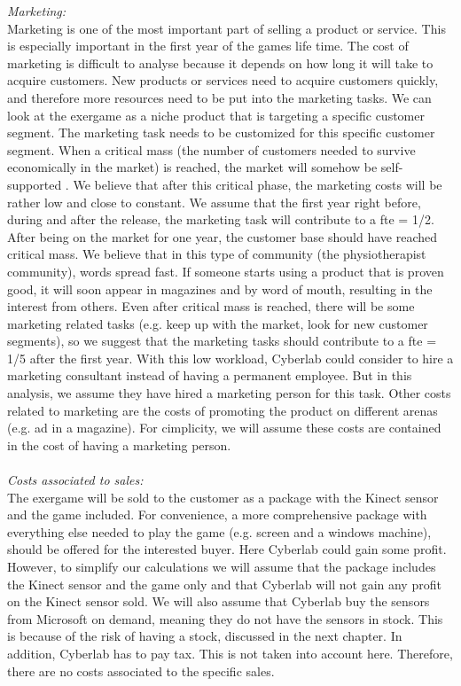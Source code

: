 \emph{Marketing:}\\
Marketing is one of the most important part of selling a product or service. This is especially important in the first year of the games life time. The cost of marketing is difficult to analyse because it depends on how long it will take to acquire customers. New products or services need to acquire customers quickly, and therefore more resources need to be put into the marketing tasks. We can look at the exergame as a niche product that is targeting a specific customer segment. The marketing task needs to be customized for this specific customer segment. When a critical mass (the number of customers needed to survive economically in the market) is reached, the market will somehow be self-supported \cite{informationrules}. We believe that after this critical phase, the marketing costs will be rather low and close to constant. We assume that the first year right before, during and after the release, the marketing task will contribute to a \ac{fte} = 1/2. After being on the market for one year, the customer base should have reached critical mass.  We believe that in this type of community (the physiotherapist community), words spread fast. If someone starts using a product that is proven good, it will soon appear in magazines and by word of mouth, resulting in the interest from others. Even after critical mass is reached, there will be some marketing related tasks (e.g. keep up with the market, look for new customer segments), so we suggest that the marketing tasks should contribute to a \ac{fte} = 1/5 after the first year. With this low workload, Cyberlab could consider to hire a marketing consultant instead of having a permanent employee. But in this analysis, we assume they have hired a marketing person for this task. Other costs related to marketing are the costs of promoting the product on different arenas (e.g. ad in a magazine). For cimplicity, we will assume these costs are contained in the cost of having a marketing person. \\ \\
\emph{Costs associated to sales:}\\
The exergame will be sold to the customer as a package with the Kinect sensor and the game included. For convenience, a more comprehensive package with everything else needed to play the game (e.g. screen and a windows machine), should be offered for the interested buyer. Here Cyberlab could gain some profit. However, to simplify our calculations we will assume that the package includes the Kinect sensor and the game only and that Cyberlab will not gain any profit on the Kinect sensor sold. We will also assume that Cyberlab buy the sensors from Microsoft on demand, meaning they do not have the sensors in stock. This is because of the risk of having a stock, discussed in the next chapter. In addition, Cyberlab has to pay tax. This is not taken into account here. Therefore, there are no costs associated to the specific sales. \\ \\
